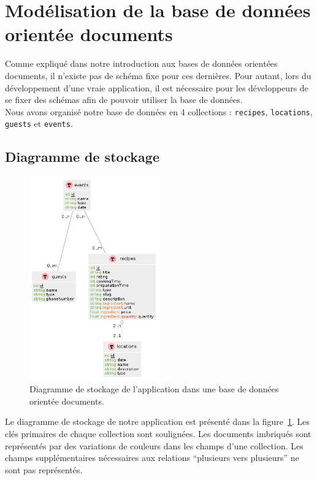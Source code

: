 \section{Modélisation de la base de données orientée documents} %
\label{sec:modelisation}

	Comme expliqué dans notre introduction aux bases de données orientées documents, il n'existe pas de schéma fixe pour ces dernières. Pour autant, lors du développement d'une vraie application, il est nécessaire pour les développeurs de se fixer des schémas afin de pouvoir utiliser la base de données.\\

	Nous avons organisé notre base de données en 4 collections : \verb|recipes|, \verb|locations|, \verb|guests| et \verb|events|.

	\subsection{Diagramme de stockage}

		\begin{figure}[H]
			\centering
			\includegraphics[width=0.5\textwidth]{images/diagramme-stockage.png}
			\caption{Diagramme de stockage de l'application dans une base de données orientée documents.}
			\label{fig:diagramme-stockage}
		\end{figure}

		Le diagramme de stockage de notre application est présenté dans la figure~\ref{fig:diagramme-stockage}. Les clés primaires de chaque collection sont soulignées. Les documents imbriqués sont représentés par des variations de couleurs dans les champs d'une collection. Les champs supplémentaires nécessaires aux relations \enquote{plusieurs vers plusieurs} ne sont pas représentés.

